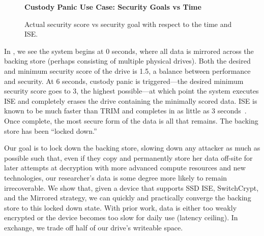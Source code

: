 \begin{figure}[ht] \textbf{Custody Panic Use Case: Security Goals vs Time}\par\medskip
   \centering
   {} \caption{Actual security score vs
   security goal with respect to the time and ISE.}
  \label{fig:usecase-custody}
\end{figure}

In , we see the system begins at 0 seconds, where
all data is mirrored across the backing store (perhaps consisting of multiple
physical drives). Both the desired and minimum security score of the drive is
1.5, a balance between performance and security. At 6 seconds, custody panic is
triggered---the desired minimum security score goes to 3, the highest
possible---at which point the system executes ISE and completely erases the
drive containing the minimally scored data. ISE is known to be much faster than
TRIM and completes in as little as 3 seconds~\cite{ISE1,ISE2,ISE3}. Once
complete, the most secure form of the data is all that remains. The backing
store has been ``locked down.''

Our goal is to lock down the backing store, slowing down any attacker as much as
possible such that, even if they copy and permanently store her data off-site
for later attempts at decryption with more advanced compute resources and new
technologies, our researcher's data is some degree more likely to remain
irrecoverable. We show that, given a device that supports SSD ISE, SwitchCrypt,
and the Mirrored strategy, we can quickly and practically converge the backing
store to this locked down state. With prior work, data is either too weakly
encrypted or the device becomes too slow for daily use (latency ceiling). In
exchange, we trade off half of our drive's writeable space.
